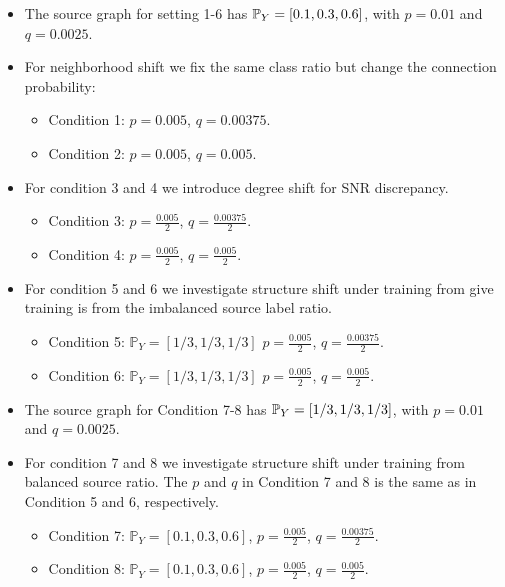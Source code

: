 \begin{itemize}
    \item The source graph for setting 1-6 has $\mathbb{P}_Y = \left[ 0.1,0.3,0.6 \right]$, with $p = 0.01$ and $q = 0.0025$.
    
    \item For neighborhood shift we fix the same class ratio but change the connection probability:
    \begin{itemize}
        \item Condition 1: $p = 0.005$, $q = 0.00375$.
        \item Condition 2: $p = 0.005$, $q = 0.005$.
    \end{itemize}

    \item For condition 3 and 4 we  introduce degree shift for SNR discrepancy.
    \begin{itemize}
        \item Condition 3: $p = \frac{0.005}{2}$, $q = \frac{0.00375}{2}$.
        \item Condition 4: $p = \frac{0.005}{2}$, $q = \frac{0.005}{2}$.
    \end{itemize}

    \item For condition 5 and 6 we investigate structure shift under training from give training is from the imbalanced source label ratio.
    \begin{itemize}
        \item Condition 5: $\mathbb{P}_Y =  \left[ 1/3, 1/3, 1/3\right]$ $p = \frac{0.005}{2}$, $q = \frac{0.00375}{2}$.
        \item Condition 6: $\mathbb{P}_Y =  \left[ 1/3, 1/3, 1/3\right]$ $p = \frac{0.005}{2}$, $q = \frac{0.005}{2}$.
    \end{itemize}

    \item The source graph for Condition 7-8 has $\mathbb{P}_Y = \left[ 1/3, 1/3, 1/3\right]$, with $p = 0.01$ and $q = 0.0025$.

    \item For condition 7 and 8 we investigate structure shift under training from balanced source ratio. The $p$ and $q$ in Condition 7 and 8 is the same as in Condition 5 and 6, respectively.
    \begin{itemize}
        \item Condition 7: $\mathbb{P}_Y = [0.1, 0.3, 0.6]$, $p = \frac{0.005}{2}$, $q = \frac{0.00375}{2}$.
        \item Condition 8: $\mathbb{P}_Y = [0.1, 0.3, 0.6]$, $p = \frac{0.005}{2}$, $q = \frac{0.005}{2}$.
    \end{itemize}
\end{itemize}

